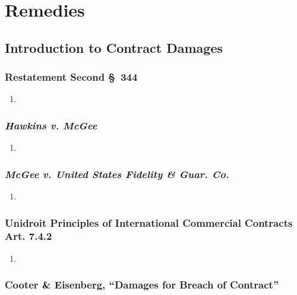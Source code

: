 \section{Remedies}

\subsection{Introduction to Contract Damages}

\subsubsection{Restatement Second \S\ 344}

\begin{enumerate}
    \item %
\end{enumerate}

\subsubsection{\emph{Hawkins v. McGee}}

\begin{enumerate}
    \item %
\end{enumerate}

\subsubsection{\emph{McGee v. United States Fidelity \& Guar. Co.}}

\begin{enumerate}
    \item %
\end{enumerate}

\subsubsection{Unidroit Principles of International Commercial Contracts Art. 
7.4.2}

\begin{enumerate}
    \item %
\end{enumerate}

\subsubsection{Cooter \& Eisenberg, ``Damages for Breach of Contract''}

